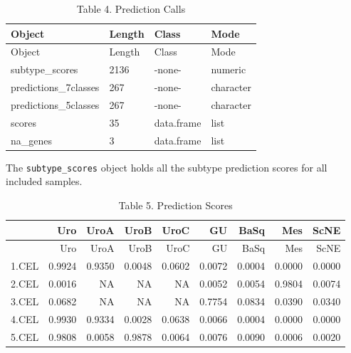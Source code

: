 \documentclass[
]{article}
\newenvironment{Shaded}{\begin{snugshade}}{\end{snugshade}}
\newcommand{\AttributeTok}[1]{\textcolor[rgb]{0.13,0.29,0.53}{#1}}
\newcommand{\DecValTok}[1]{\textcolor[rgb]{0.00,0.00,0.81}{#1}}
\newcommand{\FunctionTok}[1]{\textcolor[rgb]{0.13,0.29,0.53}{\textbf{#1}}}
\newcommand{\NormalTok}[1]{#1}
\newcommand{\SpecialCharTok}[1]{\textcolor[rgb]{0.81,0.36,0.00}{\textbf{#1}}}
\newcommand{\StringTok}[1]{\textcolor[rgb]{0.31,0.60,0.02}{#1}}
\begin{document}
\begin{longtable}[]{@{}llll@{}}
\caption{Table 4. Prediction Calls}\tabularnewline
\toprule\noalign{}
Object & Length & Class & Mode \\
\midrule\noalign{}
\endfirsthead
\toprule\noalign{}
Object & Length & Class & Mode \\
\midrule\noalign{}
\endhead
\bottomrule\noalign{}
\endlastfoot
subtype\_scores & 2136 & -none- & numeric \\
predictions\_7classes & 267 & -none- & character \\
predictions\_5classes & 267 & -none- & character \\
scores & 35 & data.frame & list \\
na\_genes & 3 & data.frame & list \\
\end{longtable}

The \texttt{subtype\_scores} object holds all the subtype prediction
scores for all included samples.

\begin{Shaded}
\end{Shaded}

\begin{longtable}[]{@{}lrrrrrrrr@{}}
\caption{Table 5. Prediction Scores}\tabularnewline
\toprule\noalign{}
& Uro & UroA & UroB & UroC & GU & BaSq & Mes & ScNE \\
\midrule\noalign{}
\endfirsthead
\toprule\noalign{}
& Uro & UroA & UroB & UroC & GU & BaSq & Mes & ScNE \\
\midrule\noalign{}
\endhead
\bottomrule\noalign{}
\endlastfoot
1.CEL & 0.9924 & 0.9350 & 0.0048 & 0.0602 & 0.0072 & 0.0004 & 0.0000 &
0.0000 \\
2.CEL & 0.0016 & NA & NA & NA & 0.0052 & 0.0054 & 0.9804 & 0.0074 \\
3.CEL & 0.0682 & NA & NA & NA & 0.7754 & 0.0834 & 0.0390 & 0.0340 \\
4.CEL & 0.9930 & 0.9334 & 0.0028 & 0.0638 & 0.0066 & 0.0004 & 0.0000 &
0.0000 \\
5.CEL & 0.9808 & 0.0058 & 0.9878 & 0.0064 & 0.0076 & 0.0090 & 0.0006 &
0.0020 \\
\end{longtable}
\end{document}
